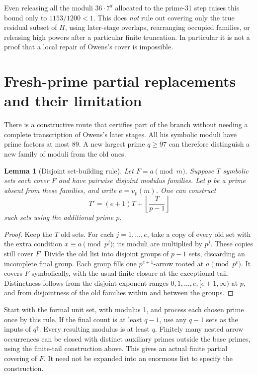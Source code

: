 \documentclass[11pt]{article}
\newtheorem{lemma}{Lemma}
\begin{document}
Even releasing all the moduli $36\cdot7^d$ allocated to the prime-31 step
raises this bound only to $1153/1200<1$. This does \emph{not} rule out
covering only the true residual subset of $H$, using later-stage overlaps,
rearranging occupied families, or releasing high powers after a particular
finite truncation. In particular it is not a proof that a local repair of
Owens's cover is impossible.

\section{Fresh-prime partial replacements and their limitation}
There is a constructive route that certifies part of the branch without
needing a complete transcription of Owens's later stages. All his symbolic
moduli have prime factors at most 89. A new largest prime $q\geq97$ can
therefore distinguish a new family of moduli from the old ones.

\begin{lemma}[Disjoint set-building rule]\label{lem:sets}
Let $F=a\pmod m$. Suppose $T$ symbolic sets each cover $F$ and have
pairwise disjoint modulus families. Let $p$ be a prime absent from these
families, and write $e=v_p(m)$. One can construct
\[
 T'=(e+1)T+\left\lfloor\frac{T}{p-1}\right\rfloor
\]
such sets using the additional prime $p$.
\end{lemma}
\begin{proof}
Keep the $T$ old sets. For each $j=1,\ldots,e$, take a copy of every old
set with the extra condition $x\equiv a\pmod{p^j}$; its moduli are
multiplied by $p^j$. These copies still cover $F$.
Divide the old list into disjoint groups of $p-1$ sets, discarding an
incomplete final group. Each group fills one $p^{e+1}$-arrow rooted at
$a\pmod{p^e}$. It covers $F$ symbolically, with the usual finite closure
at the exceptional tail. Distinctness follows from the disjoint exponent
ranges $0,1,\ldots,e,[e+1,\infty)$ at $p$, and from disjointness of
the old families within and between the groups.
\end{proof}

Start with the formal unit set, with modulus 1, and process each chosen
prime once by this rule. If the final count is at least $q-1$, use any
$q-1$ sets as the inputs of $q^\uparrow$. Every resulting modulus is at
least $q$. Finitely many nested arrow occurrences can be closed with
distinct auxiliary primes outside the base primes, using the finite-tail
construction above. This gives an actual finite partial covering of $F$.
It need not be expanded into an enormous list to specify the construction.
\end{document}
